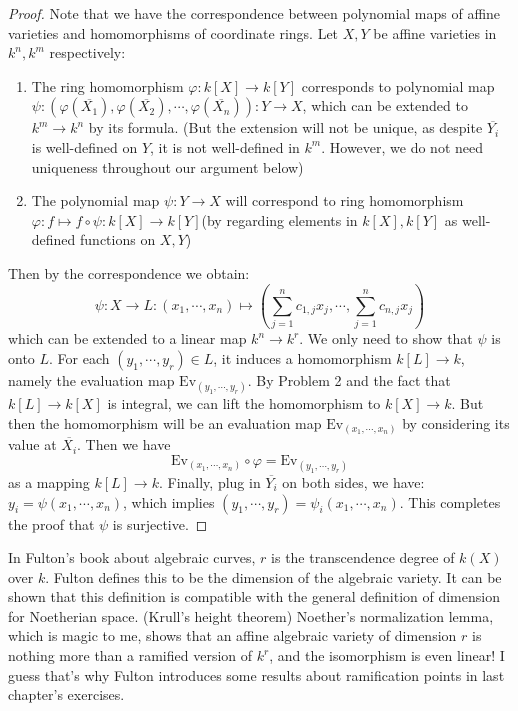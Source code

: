 \documentclass{solution}
\begin{document}
\begin{proof}
    Note that we have the correspondence between polynomial maps of affine varieties and homomorphisms of coordinate rings. Let $X, Y$ be affine varieties in $k^n, k^m$ respectively:
    \begin{enumerate}
        \item The ring homomorphism $\varphi: k[X] \rightarrow k[Y]$ corresponds to polynomial map $\psi: (\varphi(\overline{X_1}), \varphi(\overline{X_2}), \cdots, \varphi(\overline{X_n})): Y \rightarrow X$, which can be extended to $k^m \rightarrow k^n$ by its formula. (But the extension will not be unique, as despite $\overline{Y_i}$ is well-defined on $Y$, it is not well-defined in $k^m$. However, we do not need uniqueness throughout our argument below)
        \item The polynomial map $\psi: Y \rightarrow X$ will correspond to ring homomorphism $\varphi: f \mapsto f \circ \psi: k[X] \rightarrow k[Y]$(by regarding elements in $k[X], k[Y]$ as well-defined functions on $X, Y$)
    \end{enumerate}
    
    Then by the correspondence we obtain:
    $$\psi: X \rightarrow L: (x_1, \cdots, x_n) \mapsto (\sum\limits_{j = 1}^{n} c_{1, j} x_j, \cdots, \sum\limits_{j = 1}^{n} c_{n, j} x_j)$$
    which can be extended to a linear map $k^n \rightarrow k^r$. We only need to show that $\psi$ is onto $L$. For each $(y_1, \cdots, y_r) \in L$, it induces a homomorphism $k[L] \rightarrow k$, namely the evaluation map $\mathrm{Ev}_{(y_1, \cdots, y_r)}$. By Problem 2 and the fact that $k[L] \rightarrow k[X]$ is integral, we can lift the homomorphism to $k[X] \rightarrow k$. But then the homomorphism will be an evaluation map $\mathrm{Ev}_{(x_1, \cdots, x_n)}$ by considering its value at $\overline{X_i}$. Then we have
    $$\mathrm{Ev}_{(x_1, \cdots, x_n)} \circ \varphi = \mathrm{Ev}_{(y_1, \cdots, y_r)}$$
    as a mapping $k[L] \rightarrow k$. Finally, plug in $\overline{Y_i}$ on both sides, we have: $y_i = \psi(x_1, \cdots, x_n)$, which implies $(y_1, \cdots, y_r) = \psi_i(x_1, \cdots, x_n)$. This completes the proof that $\psi$ is surjective.
\end{proof}

{\color{red} In Fulton's book about algebraic curves, $r$ is the transcendence degree of $k(X)$ over $k$. Fulton defines this to be the dimension of the algebraic variety. It can be shown that this definition is compatible with the general definition of dimension for Noetherian space. (Krull's height theorem) Noether's normalization lemma, which is magic to me, shows that an affine algebraic variety of dimension $r$ is nothing more than a ramified version of $k^r$, and the isomorphism is even linear! I guess that's why Fulton introduces some results about ramification points in last chapter's exercises.}
\end{document}
